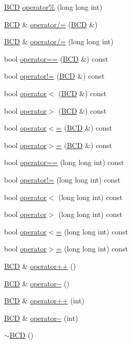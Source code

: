 \begin{DoxyCompactItemize}
\item 
\hyperlink{class_b_c_d}{B\+CD} \hyperlink{class_b_c_d_a62ae94260e6c3c68b51cbccba99f51de}{operator\%} (long long int)
\item 
\hyperlink{class_b_c_d}{B\+CD} \& \hyperlink{class_b_c_d_a53b74062af43a3d724e5f2220748ab3f}{operator/=} (\hyperlink{class_b_c_d}{B\+CD} \&)
\item 
\hyperlink{class_b_c_d}{B\+CD} \& \hyperlink{class_b_c_d_ae35127ddaaff18d6c29e507493c77bb8}{operator/=} (long long int)
\item 
bool \hyperlink{class_b_c_d_aadbf4462b5f0bb8b8c98ff4961b95b86}{operator==} (\hyperlink{class_b_c_d}{B\+CD} \&) const 
\item 
bool \hyperlink{class_b_c_d_af20cd92b399edafba2ad795d29ccd5f6}{operator!=} (\hyperlink{class_b_c_d}{B\+CD} \&) const 
\item 
bool \hyperlink{class_b_c_d_aee42288cf3a62a32787f36fd0494a3b3}{operator$<$} (\hyperlink{class_b_c_d}{B\+CD} \&) const 
\item 
bool \hyperlink{class_b_c_d_a2914bb6f35b5aa1d5fa01d67b049013b}{operator$>$} (\hyperlink{class_b_c_d}{B\+CD} \&) const 
\item 
bool \hyperlink{class_b_c_d_a42b13e423d962f0884c50279e13037aa}{operator$<$=} (\hyperlink{class_b_c_d}{B\+CD} \&) const 
\item 
bool \hyperlink{class_b_c_d_a402ff06106cdb1ce201570a80ec48f6f}{operator$>$=} (\hyperlink{class_b_c_d}{B\+CD} \&) const 
\item 
bool \hyperlink{class_b_c_d_acfa1f0c305e484eb7b520a0906abb51c}{operator==} (long long int) const 
\item 
bool \hyperlink{class_b_c_d_a74f08e4fc9ee0201df2f5e9fd82930ec}{operator!=} (long long int) const 
\item 
bool \hyperlink{class_b_c_d_a126b3381890edac0b072bcf5406bd985}{operator$<$} (long long int) const 
\item 
bool \hyperlink{class_b_c_d_aa9ed156cd530f86063efcb0fa4678cd7}{operator$>$} (long long int) const 
\item 
bool \hyperlink{class_b_c_d_a9e6876bd839d97043bbdaf8a5eec3313}{operator$<$=} (long long int) const 
\item 
bool \hyperlink{class_b_c_d_adce781134ab6ff35324ce3bc11d51259}{operator$>$=} (long long int) const 
\item 
\hyperlink{class_b_c_d}{B\+CD} \& \hyperlink{class_b_c_d_af88e88305df4a32f89f62db0ae4539ca}{operator++} ()
\item 
\hyperlink{class_b_c_d}{B\+CD} \& \hyperlink{class_b_c_d_a2880d48678d7eb3b8b94e7599957fbb5}{operator-\/-\/} ()
\item 
\hyperlink{class_b_c_d}{B\+CD} \& \hyperlink{class_b_c_d_ace340726c5401725bde35eab4ef52afe}{operator++} (int)
\item 
\hyperlink{class_b_c_d}{B\+CD} \& \hyperlink{class_b_c_d_aec925d125975eb88dd6940bd988ef8dc}{operator-\/-\/} (int)
\item 
\hyperlink{class_b_c_d_ad95f3efaf3e0559d25d5c65f849f9a57}{$\sim$\+B\+CD} ()
\end{DoxyCompactItemize}
